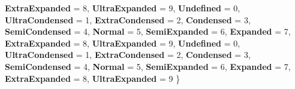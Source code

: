 \begin{DoxyCompactItemize}
{\bfseries Extra\+Expanded} = 8, 
{\bfseries Ultra\+Expanded} = 9, 
{\bfseries Undefined} = 0, 
{\bfseries Ultra\+Condensed} = 1, 
\newline
{\bfseries Extra\+Condensed} = 2, 
{\bfseries Condensed} = 3, 
{\bfseries Semi\+Condensed} = 4, 
{\bfseries Normal} = 5, 
\newline
{\bfseries Semi\+Expanded} = 6, 
{\bfseries Expanded} = 7, 
{\bfseries Extra\+Expanded} = 8, 
{\bfseries Ultra\+Expanded} = 9, 
\newline
{\bfseries Undefined} = 0, 
{\bfseries Ultra\+Condensed} = 1, 
{\bfseries Extra\+Condensed} = 2, 
{\bfseries Condensed} = 3, 
\newline
{\bfseries Semi\+Condensed} = 4, 
{\bfseries Normal} = 5, 
{\bfseries Semi\+Expanded} = 6, 
{\bfseries Expanded} = 7, 
\newline
{\bfseries Extra\+Expanded} = 8, 
{\bfseries Ultra\+Expanded} = 9
 \}
\end{DoxyCompactItemize}
